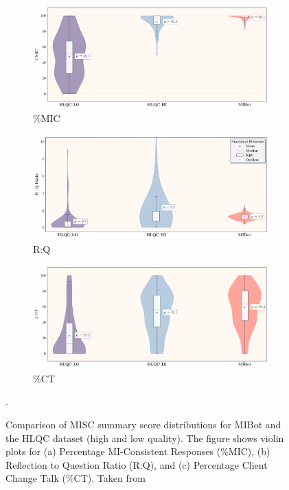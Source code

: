 \begin{figure}[htpb]
\centering
\begin{subfigure}[b]{0.9\textwidth}
\centering
\includegraphics[height=0.25\textheight, keepaspectratio]{fig/mic_enhanced.pdf}
\caption{\%MIC}
\end{subfigure}

\begin{subfigure}[b]{0.9\textwidth}
\centering
\includegraphics[height=0.25\textheight, keepaspectratio]{fig/rq_enhanced.pdf}
\caption{R:Q}
\end{subfigure}

\begin{subfigure}[b]{0.9\textwidth}
\centering
\includegraphics[height=0.25\textheight, keepaspectratio]{fig/cs_enhanced.pdf}
\caption{\%CT}
\end{subfigure}

\caption[Comparison of MISC summary score distributions for MIBot and the HLQC dataset.]{Comparison of MISC summary score distributions for MIBot and the HLQC dataset (high and low quality). The figure shows violin plots for (a) Percentage MI-Consistent Responses (\%MIC), (b) Reflection to Question Ratio (R:Q), and (c) Percentage Client Change Talk (\%CT). Taken from \citet{ali2025thesis}}.
\label{fig:misc_distributions}
\end{figure}


